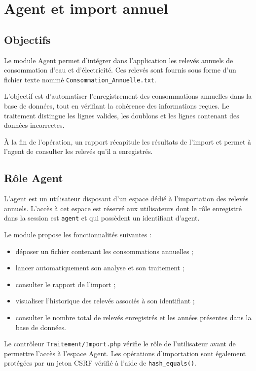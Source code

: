 
\chapter{Agent et import annuel}
\label{chap:agent}

\section{Objectifs}

Le module Agent permet d'intégrer dans l'application les relevés annuels de consommation d'eau et d'électricité. Ces relevés sont fournis sous forme d'un fichier texte nommé \texttt{Consommation\_Annuelle.txt}.

L'objectif est d'automatiser l'enregistrement des consommations annuelles dans la base de données, tout en vérifiant la cohérence des informations reçues. Le traitement distingue les lignes valides, les doublons et les lignes contenant des données incorrectes.

À la fin de l'opération, un rapport récapitule les résultats de l'import et permet à l'agent de consulter les relevés qu'il a enregistrés.

\section{Rôle Agent}

L'agent est un utilisateur disposant d'un espace dédié à l'importation des relevés annuels. L'accès à cet espace est réservé aux utilisateurs dont le rôle enregistré dans la session est \texttt{agent} et qui possèdent un identifiant d'agent.

Le module propose les fonctionnalités suivantes :
\begin{itemize}
    \item déposer un fichier contenant les consommations annuelles ;
    \item lancer automatiquement son analyse et son traitement ;
    \item consulter le rapport de l'import ;
    \item visualiser l'historique des relevés associés à son identifiant ;
    \item consulter le nombre total de relevés enregistrés et les années présentes dans la base de données.
\end{itemize}

Le contrôleur \texttt{Traitement/Import.php} vérifie le rôle de l'utilisateur avant de permettre l'accès à l'espace Agent. Les opérations d'importation sont également protégées par un jeton CSRF vérifié à l'aide de \texttt{hash\_equals()}.

